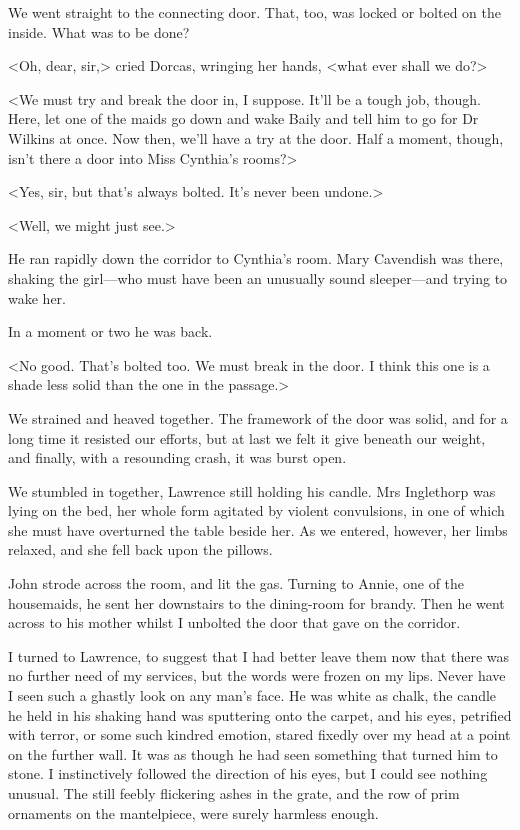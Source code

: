  We went straight to the connecting door. That, too, was locked or bolted on the inside. What was to be done? 

 <Oh, dear, sir,> cried Dorcas, wringing her hands, <what ever shall we do?> 

 <We must try and break the door in, I suppose. It'll be a tough job, though. Here, let one of the maids go down and wake Baily and tell him to go for Dr Wilkins at once. Now then, we'll have a try at the door. Half a moment, though, isn't there a door into Miss Cynthia's rooms?> 

 <Yes, sir, but that's always bolted. It's never been undone.> 

 <Well, we might just see.> 

 He ran rapidly down the corridor to Cynthia's room. Mary Cavendish was there, shaking the girl—who must have been an unusually sound sleeper—and trying to wake her. 

 In a moment or two he was back. 

 <No good. That's bolted too. We must break in the door. I think this one is a shade less solid than the one in the passage.> 

 We strained and heaved together. The framework of the door was solid, and for a long time it resisted our efforts, but at last we felt it give beneath our weight, and finally, with a resounding crash, it was burst open. 

 We stumbled in together, Lawrence still holding his candle. Mrs Inglethorp was lying on the bed, her whole form agitated by violent convulsions, in one of which she must have overturned the table beside her. As we entered, however, her limbs relaxed, and she fell back upon the pillows. 

 John strode across the room, and lit the gas. Turning to Annie, one of the housemaids, he sent her downstairs to the dining-room for brandy. Then he went across to his mother whilst I unbolted the door that gave on the corridor. 

 I turned to Lawrence, to suggest that I had better leave them now that there was no further need of my services, but the words were frozen on my lips. Never have I seen such a ghastly look on any man's face. He was white as chalk, the candle he held in his shaking hand was sputtering onto the carpet, and his eyes, petrified with terror, or some such kindred emotion, stared fixedly over my head at a point on the further wall. It was as though he had seen something that turned him to stone. I instinctively followed the direction of his eyes, but I could see nothing unusual. The still feebly flickering ashes in the grate, and the row of prim ornaments on the mantelpiece, were surely harmless enough. 


